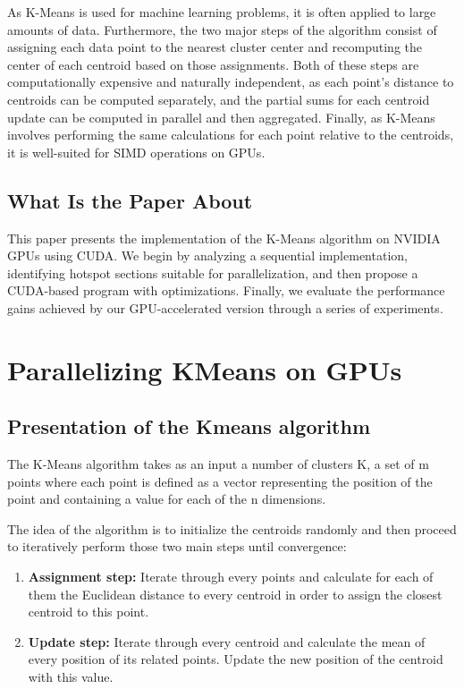 \documentclass[sigconf]{acmart}
\begin{document}
As K-Means is used for machine learning problems, it is often applied to large amounts of data. Furthermore, the two major steps of the algorithm consist of assigning each data point to the nearest cluster center and recomputing the center of each centroid based on those assignments. Both of these steps are computationally expensive and naturally independent, as each point’s distance to centroids can be computed separately, and the partial sums for each centroid update can be computed in parallel and then aggregated. Finally, as K-Means involves performing the same calculations for each point relative to the centroids, it is well-suited for SIMD operations on GPUs.

\subsection{What Is the Paper About}

This paper presents the implementation of the K-Means algorithm on NVIDIA GPUs using CUDA. We begin by analyzing a sequential implementation, identifying hotspot sections suitable for parallelization, and then propose a CUDA-based program with optimizations. Finally, we evaluate the performance gains achieved by our GPU-accelerated version through a series of experiments.

\section{Parallelizing KMeans on GPUs}

\subsection{Presentation of the Kmeans algorithm}

The K-Means algorithm takes as an input a number of clusters K, a set of m points where each point is defined as a vector representing the position of the point and containing a value for each of the n dimensions.

The idea of the algorithm is to initialize the centroids randomly and then proceed to iteratively perform those two main steps until convergence:
\begin{enumerate}
  \item \textbf{Assignment step:} Iterate through every points and calculate for each of them the Euclidean distance to every centroid in order to assign the closest centroid to this point. \\
\item \textbf{Update step:} Iterate through every centroid and calculate the mean of every position of its related points. Update the new position of the centroid with this value.
\end{enumerate}
\end{document}
